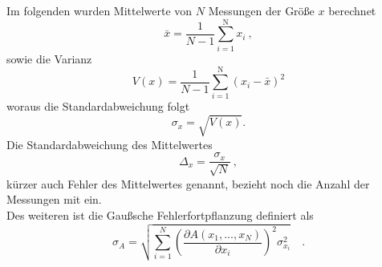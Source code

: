 Im folgenden wurden Mittelwerte von $N$ Messungen der Größe $x$ berechnet
\begin{equation}
\bar{x} =  \frac{1}{N-1} \sum_{i=1}^\text{N} x_i \ ,
\end{equation}
sowie die Varianz
\begin{equation}
V(x) = \frac{1}{N-1} \sum_{i=1}^\text{N} (x_i - \bar{x})^2
\end{equation}
woraus die Standardabweichung folgt
\begin {equation}
\sigma_x = \sqrt{V(x)}.
\end{equation}
Die Standardabweichung des Mittelwertes
\begin{equation}
\Delta_{x} = \frac{\sigma_x}{\sqrt{N}} \ ,
\end{equation}
kürzer auch Fehler des Mittelwertes genannt, bezieht noch die Anzahl der Messungen mit ein. \\
Des weiteren ist die Gaußsche Fehlerfortpflanzung definiert als
\begin{equation}
\sigma_A = \sqrt{ \sum_{i=1}^N  \left(   \frac{\partial A(x_1, ... ,x_N)}{\partial x_i} \right)^2 \sigma_{x_i} ^2 } \quad .
\end{equation}

